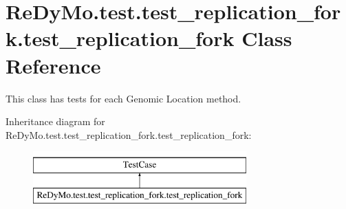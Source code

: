 \hypertarget{classReDyMo_1_1test_1_1test__replication__fork_1_1test__replication__fork}{}\section{Re\+Dy\+Mo.\+test.\+test\+\_\+replication\+\_\+fork.\+test\+\_\+replication\+\_\+fork Class Reference}
\label{classReDyMo_1_1test_1_1test__replication__fork_1_1test__replication__fork}


This class has tests for each Genomic Location method.  


Inheritance diagram for Re\+Dy\+Mo.\+test.\+test\+\_\+replication\+\_\+fork.\+test\+\_\+replication\+\_\+fork\+:\begin{figure}[H]
\begin{center}
\leavevmode
\includegraphics[height=2.000000cm]{classReDyMo_1_1test_1_1test__replication__fork_1_1test__replication__fork}
\end{center}
\end{figure}

